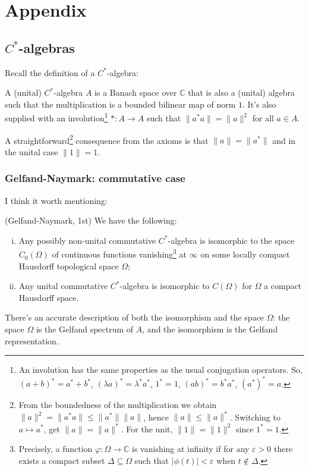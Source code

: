 \section{Appendix}
\subsection{$C^*$-algebras}
Recall the definition of a $C^*$-algebra:
\begin{definition}
A (unital) $C^*$-algebra $A$ is a Banach space over $\mathbb C$ that is also a (unital) algebra such that the multiplication is a bounded bilinear map of norm $1$. It's also supplied with an involution\footnote{An involution has the same properties as the usual conjugation operators. So, $(a+b)^* = a^* + b^*$, $(\lambda a)^* = \lambda^* a^*$, $1^* = 1$, $(ab)^* = b^* a^*$, $(a^*)^* = a$.} $*:A\rightarrow A$ such that $\|a^*a\| = \|a\|^2$ for all $a \in A$. 
\end{definition}
A straightforward\footnote{From the boundedness of the multiplication we obtain $\|a\|^2 = \|a^*a\| \leq \|a^*\|\|a\|$, hence $\|a\| \leq \|a\|^*$. Switching to $a \mapsto a^*$, get $\|a\| = \|a\|^*$. For the unit, $\|1\| = \|1\|^2$ since $1^* = 1$.} consequence from the axioms is that $\|a\| = \|a^*\|$ and in the unital case $\|1\| = 1$.

\subsubsection{Gelfand-Naymark: commutative case}
I think it worth mentioning:
\begin{theorem}
(Gelfand-Naymark, 1st) We have the following:
\begin{enumerate}[(i)]
\item Any possibly non-unital commutative $C^*$-algebra is isomorphic to the space $C_0(\Omega)$ of continuous functions vanishing\footnote{Precisely, a function $\varphi : \Omega \rightarrow \mathbb C$ is vanishing at infinity if for any $\varepsilon >0$ there exists a compact subset $\Delta \subseteq \Omega$ such that $|\phi(t)|< \varepsilon$ when $t \notin \Delta$.} at $\infty$ on some locally compact Hausdorff topological space $\Omega$;
\item Any unital commutative $C^*$-algebra is isomorphic to $C(\Omega)$ for $\Omega$ a compact Hausdorff space.
\end{enumerate}
\end{theorem}

There's an accurate description of both the isomorphism and the space $\Omega$: the space $\Omega$ is the Gelfand spectrum of $A$, and the isomorphism is the Gelfand representation.


